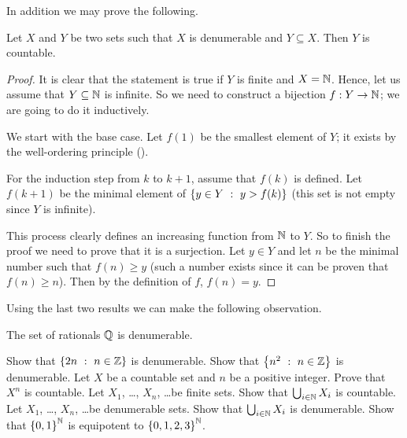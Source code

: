 In addition we may prove the following.
\begin{theorem}
  Let $X$ and $Y$ be two sets such that $X$ is denumerable and $Y \subseteq X$.
  Then $Y$ is countable.
\end{theorem}
\begin{proof}
  It is clear that the statement is true if $Y$ is finite and $X = {\mathbb{N}}$. 
  Hence, let us assume that $Y \subseteq {\mathbb{N}}$ is infinite. So we need to
  construct a bijection $f : Y \to {\mathbb{N}}$; we are going to do it inductively.

  We start with the base case.
  Let $f(1)$ be the smallest element of $Y$; it exists by the well-ordering
  principle (). 

  For the induction step from $k$ to $k + 1$, assume that $f(k)$ is defined.
  Let $f(k + 1)$ be the minimal element of $\set[y > f(k)]{y \in Y}$ (this set
  is not empty since $Y$ is infinite).

  This process clearly defines an increasing function from ${\mathbb{N}}$ to $Y$. So to
  finish the proof we need to prove that it is a surjection.
  Let $y \in Y$ and let $n$ be the minimal number such that $f(n) \ge y$ (such a
  number exists since it can be proven that $f(n) \ge n$). Then by the
  definition of $f$, $f(n) = y$.
\end{proof}

Using the last two results we can make the following observation.
\begin{theorem}
  The set of rationals ${\mathbb{Q}}$ is denumerable.
\end{theorem}

\begin{chapterendexercises}
    \exercise[recommended] Show that $\set[n \in \Z]{2n}$ is denumerable.
    \exercise Show that $\set[n \in \Z]{n^2}$ is denumerable.
    \exercise Let $X$ be a countable set and $n$ be a positive integer. Prove
      that $X^n$ is countable.
    \exercise[recommended] Let $X_1$, \dots, $X_n$, \dots be finite sets. Show that
      $\bigcup_{i \in {\mathbb{N}}} X_i$ is countable.
    \exercise Let $X_1$, \dots, $X_n$, \dots be denumerable sets. Show that
      $\bigcup_{i \in {\mathbb{N}}} X_i$ is denumerable.
    \exercise Show that $\set{0, 1}^\N$ is equipotent to $\set{0, 1, 2, 3}^\N$.
\end{chapterendexercises}

